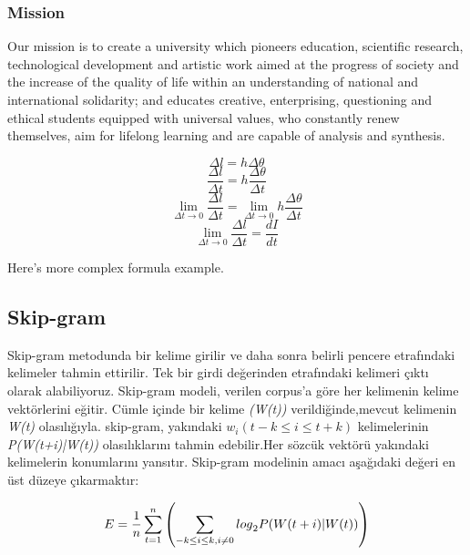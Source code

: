 \subsubsection{Mission}
Our mission is to create a university which pioneers education, scientific research, technological development and artistic work aimed at the progress of society and the increase of the quality of life within an understanding of national and international solidarity; and educates creative, enterprising, questioning and ethical students equipped with universal values, who constantly renew themselves, aim for lifelong learning and are capable of analysis and synthesis.

\begin{equation}
\Delta  l = h \Delta \theta
\end{equation}
\begin{equation}
\frac{\Delta l}{\Delta t} = h \frac{\Delta \theta}{\Delta t}
\end{equation}
\begin{equation}
\lim_{\Delta t \rightarrow 0}\frac{\Delta l}{\Delta t} = \lim_{\Delta t \rightarrow 0} h \frac{\Delta \theta}{\Delta t}
\end{equation}
\begin{equation}
\lim_{\Delta t \rightarrow 0}\frac{\Delta l}{\Delta t} = \frac{dI}{dt}
\end{equation}

Here's more complex formula example.

\subsection{Skip-gram}
Skip-gram metodunda bir kelime girilir ve daha sonra belirli pencere etrafındaki kelimeler tahmin ettirilir. Tek bir girdi değerinden etrafındaki kelimeri çıktı olarak alabiliyoruz. Skip-gram modeli, verilen corpus'a göre her kelimenin kelime vektörlerini eğitir. Cümle içinde bir kelime \textit{(W(t))} verildiğinde,mevcut kelimenin \textit{W(t)} olasılığıyla. skip-gram, yakındaki $w_{i}(t-k\leqslant i\leqslant t + k)$ kelimelerinin \textit{P(W(t+i)|W(t))} olasılıklarını tahmin edebilir.Her sözcük vektörü yakındaki kelimelerin konumlarını yansıtır. Skip-gram modelinin amacı aşağıdaki değeri en üst düzeye çıkarmaktır:

\begin{equation}
    \centering
    E=\frac{1}{n}\sum\limits_{t=1}^{n}{\left(\sum\limits_{-k\le i\le k,i\ne 0}{{{log}_{2}}P(W(t+i)|W(t))} \right)}
\end{equation}


